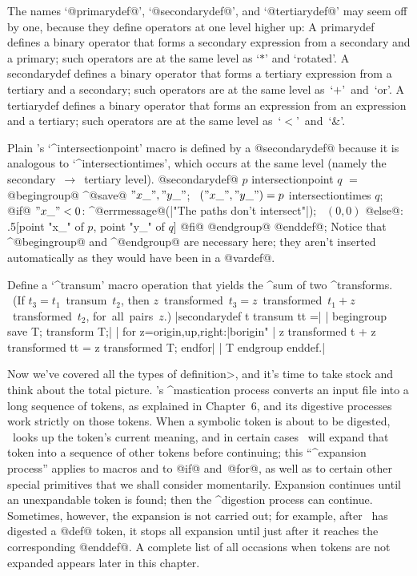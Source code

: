 \ddanger The names `@primarydef@\kern1pt', `@secondarydef@\kern1pt',
and `@tertiarydef@\kern1pt' may
seem off by one, because they define operators at one level higher up:
A primarydef defines a binary operator that forms a secondary expression
from a secondary and a primary; such operators are at the same level
as `$\ast$' and `rotated'.
A secondarydef defines a binary operator that forms a tertiary expression
from a tertiary and a secondary; such operators are at the same level
as~`$+$'~and~`or'.
A tertiarydef defines a binary operator that forms an expression
from an expression and a tertiary; such operators are at the same level
as~`$<$'~and~`\&'.

\ddanger Plain \MF's `^{intersectionpoint}' macro is defined by a
@secondarydef@ because it is analogous to `^{intersectiontimes}', which
occurs at the same level (namely the secondary~$\rightarrow$~tertiary level).
\begindisplay
@secondarydef@ $p$ intersectionpoint $q$ $=$\cr
\quad @begingroup@ ^@save@ $"x\_","y\_"$; \
 $("x\_","y\_")=p$ intersectiontimes $q$;\cr
\quad @if@ $"x\_"<0$: ^@errmessage@(|"The paths don't intersect"|);
 \ $(0,0)$\cr
\quad @else@: .5[point "x\_" of $p$,
 point "y\_" of $q$] @fi@ @endgroup@ @enddef@;\cr
\enddisplay
Notice that ^@begingroup@ and ^@endgroup@ are necessary here; they aren't
inserted automatically as they would have been in a @vardef@.

\ddangerexercise Define a `^{transum}' macro operation that yields
the ^{sum} of two ^{transforms}. \ (If $t_3=t_1$~transum~$t_2$, then
$z$~transformed~$t_3=z$~transformed~$t_1+z$~transformed~$t_2$,
for~all~pairs~$z$.)
\answer |secondarydef t transum tt =|\parbreak
| begingroup save T; transform T;|\parbreak
| for z=origin,up,right:|^^"origin"\parbreak
|  z transformed t + z transformed tt = z transformed T; endfor|\parbreak
|  T endgroup enddef.|

\ddanger {}
Now we've covered all the types of \<definition>, and it's time to
take stock and think about the total picture. \MF's ^{mastication} process
converts an input file into a long sequence of tokens, as explained in
Chapter~6, and its digestive processes work strictly on those tokens.
When a symbolic token is about to be digested, \MF\ looks up the token's
current meaning, and in certain cases \MF\ will expand that token into
a sequence of other tokens before continuing; this ``^{expansion process}''
applies to macros and to @if@ and~@for@, as well as to certain other
special primitives that we shall consider momentarily. Expansion
continues until an unexpandable token is found; then the ^{digestion process}
can continue. Sometimes, however, the expansion is not carried out; for
example, after \MF\ has digested a @def@ token, it stops all expansion until
just after it reaches the corresponding @enddef@. A complete list of
all occasions when tokens are not expanded appears later in this chapter.

